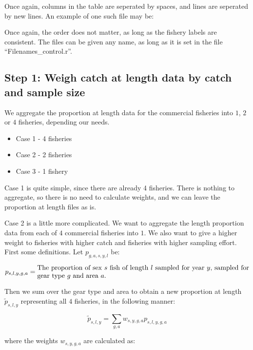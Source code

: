 \documentclass[12pt,a4paper]{article}
\begin{document}
Once again, columns in the table are seperated by spaces, and lines are seperated by new lines. An example of one such file may be:



Once again, the order does not matter, as long as the fishery labels are consistent. The files can be given any name, as long as it is set in the file ``Filenames\_control.r''.


\subsection{Step 1: Weigh catch at length data by catch and sample size}

We aggregate the proportion at length data for the commercial fisheries into $1$, $2$ or $4$ fisheries, depending our needs.

\begin{itemize}
\item Case 1 - 4 fisheries
\item Case 2 - 2 fisheries
\item Case 3 - 1 fishery
\end{itemize}

Case 1 is quite simple, since there are already 4 fisheries. There is nothing to aggregate, so there is no need to calculate weights, and we can leave the proportion at length files as is.

Case 2 is a little more complicated. We want to aggregate the length proportion data from each of $4$ commercial fisheries into $1$. We also want to give a higher weight to fisheries with higher catch and fisheries with higher sampling effort. First some definitions. Let $p_{g,a,s,y,l}$ be:

\begin{equation}
p_{s,l,y,g,a} = \text{\parbox{11cm}{The proportion of sex $s$ fish of length $l$ sampled for year $y$,
                      sampled for gear type $g$ and area $a$.}}
\end{equation}

Then we sum over the gear type and area to obtain a new proportion at length $\tilde{p}_{s,l,y}$ representing all $4$ fisheries, in the following manner:

\begin{equation}
\tilde{p}_{s,l,y} = \sum_{g,a} w_{s,y,g,a} p_{s,l,y,g,a}
\end{equation}

where the weights $w_{s,y,g,a}$ are calculated as:
\end{document}
